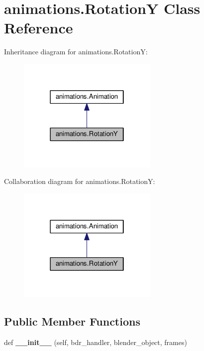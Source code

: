\hypertarget{classanimations_1_1RotationY}{}\section{animations.\+RotationY Class Reference}
\label{classanimations_1_1RotationY}


Inheritance diagram for animations.\+RotationY\+:\nopagebreak
\begin{figure}[H]
\begin{center}
\leavevmode
\includegraphics[width=190pt]{classanimations_1_1RotationY__inherit__graph}
\end{center}
\end{figure}


Collaboration diagram for animations.\+RotationY\+:\nopagebreak
\begin{figure}[H]
\begin{center}
\leavevmode
\includegraphics[width=190pt]{classanimations_1_1RotationY__coll__graph}
\end{center}
\end{figure}
\subsection*{Public Member Functions}
\begin{DoxyCompactItemize}
\item 
def {\bfseries \+\_\+\+\_\+init\+\_\+\+\_\+} (self, bdr\+\_\+handler, blender\+\_\+object, frames)\hypertarget{classanimations_1_1RotationY_ae56ace68b18a080aefbf96be9306e107}{}\label{classanimations_1_1RotationY_ae56ace68b18a080aefbf96be9306e107}

\end{DoxyCompactItemize}
